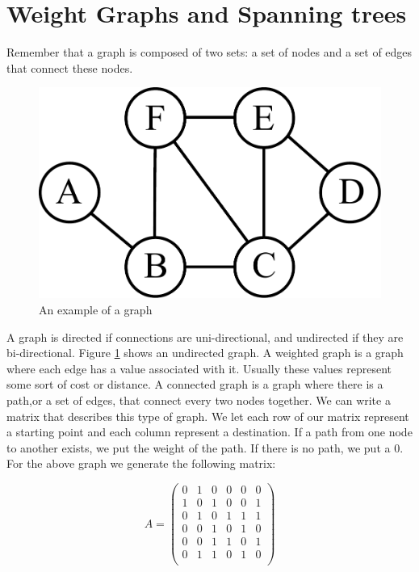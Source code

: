 \label{Ch:Kruskal}


\section*{Weight Graphs and Spanning trees}

Remember that a graph is composed of two sets: a set of nodes and a set of edges that connect these nodes. 

\begin{figure}[H]
\includegraphics[width = .4\textwidth]{graph1.pdf}
\caption{An example of a graph}
\label{mst:graph1}
\end{figure}

A graph is directed if connections are uni-directional, and undirected if they are bi-directional.
Figure \ref{mst:graph1} shows an undirected graph.
A weighted graph is a graph where each edge has a value associated with it.
Usually these values represent some sort of cost or distance.
A connected graph is a graph where there is a path,or a set of edges, that connect every two nodes together.
We can write a matrix that describes this type of graph.
We let each row of our matrix represent a starting point and each column represent a destination.
If a path from one node to another exists, we put the weight of the path.
If there is no path, we put a 0.
For the above graph we generate the following matrix:

\[
A = \begin{pmatrix}
0 & 1 & 0 & 0 & 0 & 0\\
1 & 0 & 1 & 0 & 0 & 1\\
0 & 1 & 0 & 1 & 1 & 1\\
0 & 0 & 1 & 0 & 1 & 0\\
0 & 0 & 1 & 1 & 0 & 1\\
0 & 1 & 1 & 0 & 1 & 0\\
\end{pmatrix}
\]

